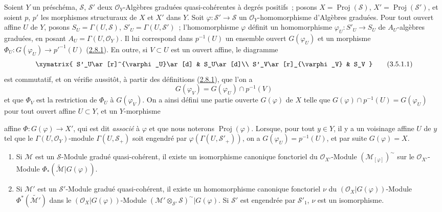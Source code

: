 \begin{env}[3.5.1]
\label{II.3.5.1-fr}
Soient $Y$ un préschéma, $\mathcal{S}$, $\mathcal{S}'$ deux
$\mathcal{O}_Y$-Algèbres graduées quasi-cohérentes à degrés positifs~; posons
$X=\operatorname{Proj}(\mathcal{S})$, $X'=\operatorname{Proj}(\mathcal{S}')$,
et soient $p$, $p'$ les morphismes structuraux de $X$ et $X'$ dans $Y$. Soit
$\varphi:\mathcal{S}'\to\mathcal{S}$ un $\mathcal{O}_Y$-homomorphisme
d'Algèbres graduées. Pour tout ouvert affine $U$ de $Y$, posons
$S_U=\Gamma(U,\mathcal{S})$, $S'_U=\Gamma(U,\mathcal{S}')$~;
l'homomorphisme $\varphi$ définit un homomorphisme
$\varphi_U:S'_U\to S_U$ de $A_U$-algèbres graduées, en posant
$A_U=\Gamma(U,\mathcal{O}_Y)$. Il lui correspond dans $p^{-1}(U)$ un ensemble
ouvert $G(\varphi_U)$ et un morphisme
$\Phi_U:G(\varphi_U)\to p'^{-1}(U)$
(\hyperref[II.2.8.1-fr]{2.8.1}). En outre, si $V\subset U$ est un ouvert
affine, le diagramme
\[
\label{II.3.5.1.1-fr}
  \xymatrix{
    S'_U\ar[r]^{\varphi_U}\ar[d]
    & S_U\ar[d]\\
    S'_V\ar[r]_{\varphi_V}
    & S_V
  }
\tag{3.5.1.1}
\]
est commutatif, et on vérifie aussitôt, à partir des définitions
(\hyperref[II.2.8.1-fr]{2.8.1}), que l'on a
\[
  G(\varphi_V)=G(\varphi_U)\cap p^{-1}(V)
\]
et que $\Phi_V$ est la restriction de $\Phi_U$ à $G(\varphi_V)$. On a ainsi
défini une partie ouverte $G(\varphi)$ de $X$ telle que
$G(\varphi)\cap p^{-1}(U)=G(\varphi_U)$ pour tout ouvert affine $U\subset Y$,
et un $Y$-morphisme


affine $\Phi:G(\varphi)\to X'$, qui est dit \emph{associé} à $\varphi$ et que
nous noterons $\operatorname{Proj}(\varphi)$. Lorsque, pour tout $y\in Y$, il
y a un voisinage affine $U$ de $y$ tel que le
$\Gamma(U,\mathcal{O}_Y)$-module $\Gamma(U,\mathcal{S}_+)$ soit engendré par
$\varphi(\Gamma(U,\mathcal{S}'_+))$, on a
$G(\varphi_U)=p^{-1}(U)$, et par suite $G(\varphi)=X$.
\end{env}

\begin{proposition}[3.5.2]
\label{II.3.5.2-fr}
\begin{enumerate}
  \item[\rm(i)] Si $\mathcal{M}$ est un $\mathcal{S}$-Module gradué
    quasi-cohérent, il existe un isomorphisme canonique fonctoriel du
    $\mathcal{O}_{X'}$-Module $(\mathcal{M}_{[\varphi]})^{\sim}$ sur le
    $\mathcal{O}_{X'}$-Module
    $\Phi_*(\widetilde{\mathcal{M}}|G(\varphi))$.
  \item[\rm(ii)] Si $\mathcal{M}'$ est un $\mathcal{S}'$-Module gradué
    quasi-cohérent, il existe un homomorphisme canonique fonctoriel $\nu$ du
    $(\mathcal{O}_X|G(\varphi))$-Module
    $\Phi^*(\widetilde{\mathcal{M}'})$ dans le
    $(\mathcal{O}_X|G(\varphi))$-Module
    $(\mathcal{M}'\otimes_{\mathcal{S}'}\mathcal{S})^{\sim}|G(\varphi)$. Si
    $\mathcal{S}'$ est engendrée par $\mathcal{S}'_1$, $\nu$ est un
    isomorphisme.
\end{enumerate}
\end{proposition}

